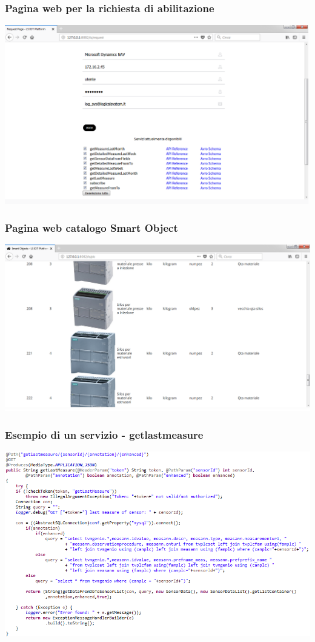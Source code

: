 \documentclass{beamer}
\begin{document}
\begin{frame}
\frametitle{Pagina web per la richiesta di abilitazione}
\includegraphics[width=1\textwidth]{images/RequestPagePlatform.png}
\end{frame}

\begin{frame}
\frametitle{Pagina web catalogo Smart Object}
\includegraphics[width=1\textwidth]{images/SmartObjectsPlatform.png}
\end{frame}

\begin{frame}
\frametitle{Esempio di un servizio - getlastmeasure}
\includegraphics[width=1\textwidth]{images/getlastmeasure.png}
\end{frame}
\end{document}
